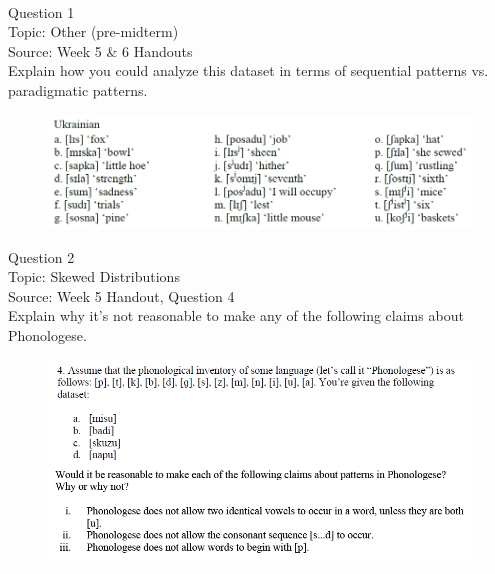 \documentclass[12pt]{article}
\begin{document}
\newpage

\begin{center}
\textbf{{\color{red}{\HUGE END OF EXAM}}}\\

\end{center}
\newpage

\begin{center}
\textbf{{\color{blue}{\HUGE START OF EXAM\\}}}

\textbf{{\color{blue}{\HUGE Student ID: 13570\\}}}

\textbf{{\color{blue}{\HUGE 4:10\\}}}

\end{center}
\newpage

{\large Question 1}\\

Topic: Other (pre-midterm)\\
Source: Week 5 \& 6 Handouts\\

Explain how you could analyze this dataset in terms of sequential patterns vs. paradigmatic patterns.\\

\begin{figure}[H]
\includegraphics{../images/ukrainian.png}
\end{figure}

\newpage

{\large Question 2}\\

Topic: Skewed Distributions\\
Source: Week 5 Handout, Question 4\\

Explain why it's not reasonable to make any of the following claims about Phonologese.\\

\begin{figure}[H]
\includegraphics{../images/Phonologese.png}
\end{figure}
\end{document}
